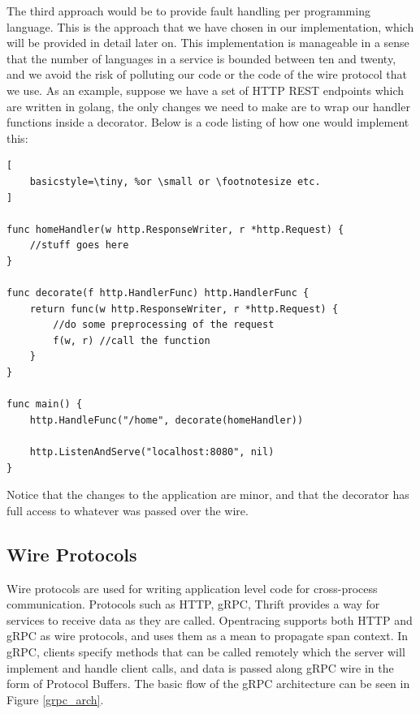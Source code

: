 \documentclass[letterpaper,twocolumn,10pt]{article}
\begin{document}
The third approach would be to provide fault handling per programming language. This is the approach that we have chosen in our implementation, which will be provided in detail later on. This implementation is manageable in a sense that the number of languages in a service is bounded between ten and twenty, and we avoid the risk of polluting our code or the code of the wire protocol that we use. As an example, suppose we have a set of HTTP REST endpoints which are written in golang\cite{google:golang}, the only changes we need to make are to wrap our handler functions inside a decorator. Below is a code listing of how one would implement this:


\begin{lstlisting}[
    basicstyle=\tiny, %or \small or \footnotesize etc.
]

func homeHandler(w http.ResponseWriter, r *http.Request) {
    //stuff goes here
}

func decorate(f http.HandlerFunc) http.HandlerFunc {
    return func(w http.ResponseWriter, r *http.Request) {
        //do some preprocessing of the request
        f(w, r) //call the function
    }
}

func main() {
    http.HandleFunc("/home", decorate(homeHandler))

    http.ListenAndServe("localhost:8080", nil)
}
\end{lstlisting}

Notice that the changes to the application are minor, and that the decorator has full access to whatever was passed over the wire.



\subsection{Wire Protocols}
Wire protocols are used for writing application level code for cross-process communication. 
Protocols such as HTTP, gRPC\cite{google:grpc}, Thrift\cite{apache:thrift} provides a way for
services to receive data as they are called. Opentracing supports both HTTP and gRPC as wire protocols,
and uses them as a mean to propagate span context. In gRPC, clients specify methods that can be called 
remotely which the server will implement and handle client calls, and data is passed along gRPC wire in the 
form of Protocol Buffers\cite{google:protobuf}. The basic flow of the gRPC architecture\cite{google:grpc} can be seen in Figure \ref{grpc_arch}.
\end{document}
